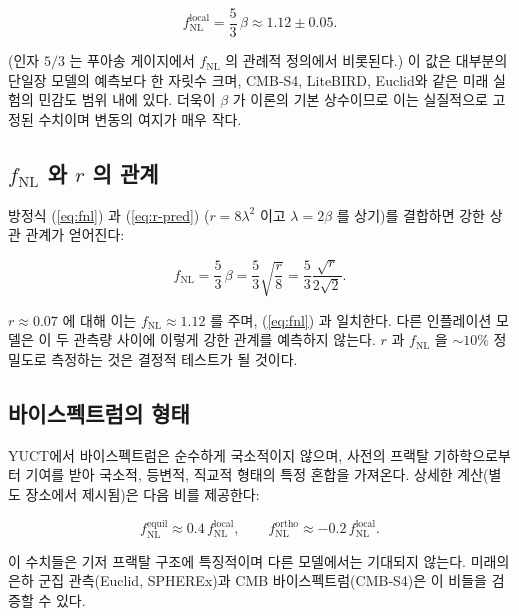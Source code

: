 \documentclass[11pt,a4paper]{article}
\theoremstyle{remark}
\begin{document}
	\begin{equation}
		f_{\text{NL}}^{\text{local}} = \frac{5}{3}\,\beta \approx 1.12 \pm 0.05.
		\label{eq:fnl}
	\end{equation}
	
	(인자 $5/3$ 는 푸아송 게이지에서 $f_{\text{NL}}$ 의 관례적 정의에서 비롯된다.) 이 값은 대부분의 단일장 모델의 예측보다 한 자릿수 크며, CMB‑S4, LiteBIRD, Euclid와 같은 미래 실험의 민감도 범위 내에 있다. 더욱이 $\beta$ 가 이론의 기본 상수이므로 이는 실질적으로 고정된 수치이며 변동의 여지가 매우 작다.
	
	\subsection{$f_{\text{NL}}$ 와 $r$ 의 관계}
	
	방정식 (\ref{eq:fnl}) 과 (\ref{eq:r-pred}) ($r = 8\lambda^2$ 이고 $\lambda = 2\beta$ 를 상기)를 결합하면 강한 상관 관계가 얻어진다:
	
	\begin{equation}
		f_{\text{NL}} = \frac{5}{3}\,\beta = \frac{5}{3}\sqrt{\frac{r}{8}} = \frac{5}{3}\frac{\sqrt{r}}{2\sqrt{2}}.
		\label{eq:fnl-r}
	\end{equation}
	
	$r \approx 0.07$ 에 대해 이는 $f_{\text{NL}} \approx 1.12$ 를 주며, (\ref{eq:fnl}) 과 일치한다. 다른 인플레이션 모델은 이 두 관측량 사이에 이렇게 강한 관계를 예측하지 않는다. $r$ 과 $f_{\text{NL}}$ 을 $\sim 10\%$ 정밀도로 측정하는 것은 결정적 테스트가 될 것이다.
	
	\subsection{바이스펙트럼의 형태}
	
	YUCT에서 바이스펙트럼은 순수하게 국소적이지 않으며, 사전의 프랙탈 기하학으로부터 기여를 받아 국소적, 등변적, 직교적 형태의 특정 혼합을 가져온다. 상세한 계산(별도 장소에서 제시됨)은 다음 비를 제공한다:
	
	\begin{equation}
		f_{\text{NL}}^{\text{equil}} \approx 0.4\, f_{\text{NL}}^{\text{local}}, \qquad
		f_{\text{NL}}^{\text{ortho}} \approx -0.2\, f_{\text{NL}}^{\text{local}}.
		\label{eq:fnl-shapes}
	\end{equation}
	
	이 수치들은 기저 프랙탈 구조에 특징적이며 다른 모델에서는 기대되지 않는다. 미래의 은하 군집 관측(Euclid, SPHEREx)과 CMB 바이스펙트럼(CMB‑S4)은 이 비들을 검증할 수 있다.
	
\end{document}
